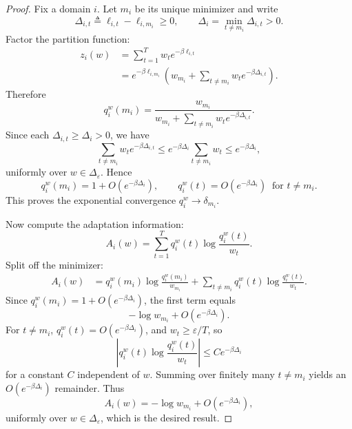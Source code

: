 \documentclass{article}
\newcommand{\simplex}{\Delta}
\newcommand{\epssimplex}{\simplex_{\varepsilon}}
\begin{document}
\begin{proof}
Fix a domain \(i\). Let \(m_i\) be its unique minimizer and write
\begin{equation}
    \Delta_{i,t}\triangleq \ell_{i,t}-\ell_{i,m_i} \ge 0,
    \qquad
    \Delta_i = \min_{t\neq m_i}\Delta_{i,t}>0.
\end{equation}
Factor the partition function:
\begin{align}
    z_i(w)
    &=
    \sum_{t=1}^{T} w_t e^{-\beta \ell_{i,t}} \\
    &=
    e^{-\beta \ell_{i,m_i}}
    \left(
        w_{m_i}
        +
        \sum_{t\neq m_i} w_t e^{-\beta \Delta_{i,t}}
    \right).
\end{align}
Therefore
\begin{equation}
    q_i^w(m_i)
    =
    \frac{w_{m_i}}
         {w_{m_i}+\sum_{t\neq m_i} w_t e^{-\beta \Delta_{i,t}}}.
\end{equation}
Since each \(\Delta_{i,t}\ge \Delta_i>0\), we have
\begin{equation}
    \sum_{t\neq m_i} w_t e^{-\beta \Delta_{i,t}}
    \le
    e^{-\beta \Delta_i}\sum_{t\neq m_i}w_t
    \le
    e^{-\beta \Delta_i},
\end{equation}
uniformly over \(w \in \epssimplex\). Hence
\begin{equation}
    q_i^w(m_i) = 1 + O(e^{-\beta \Delta_i}),
    \qquad
    q_i^w(t) = O(e^{-\beta \Delta_i}) \;\; \text{for } t\neq m_i.
\end{equation}
This proves the exponential convergence \(q_i^w \to \delta_{m_i}\).

Now compute the adaptation information:
\begin{equation}
    A_i(w)
    =
    \sum_{t=1}^{T} q_i^w(t)\log\frac{q_i^w(t)}{w_t}.
\end{equation}
Split off the minimizer:
\begin{align}
    A_i(w)
    &=
    q_i^w(m_i)\log\frac{q_i^w(m_i)}{w_{m_i}}
    +
    \sum_{t\neq m_i} q_i^w(t)\log\frac{q_i^w(t)}{w_t}.
\end{align}
Since \(q_i^w(m_i)=1+O(e^{-\beta \Delta_i})\), the first term equals
\begin{equation}
    -\log w_{m_i} + O(e^{-\beta \Delta_i}).
\end{equation}
For \(t\neq m_i\), \(q_i^w(t)=O(e^{-\beta \Delta_i})\), and \(w_t\ge \varepsilon/T\), so
\begin{equation}
    \left|q_i^w(t)\log\frac{q_i^w(t)}{w_t}\right|
    \le
    C e^{-\beta \Delta_i}
\end{equation}
for a constant \(C\) independent of \(w\). Summing over finitely many \(t\neq m_i\) yields an \(O(e^{-\beta \Delta_i})\) remainder. Thus
\begin{equation}
    A_i(w)
    =
    -\log w_{m_i} + O(e^{-\beta \Delta_i}),
\end{equation}
uniformly over \(w\in\epssimplex\), which is the desired result. \qedhere
\end{proof}
\end{document}
